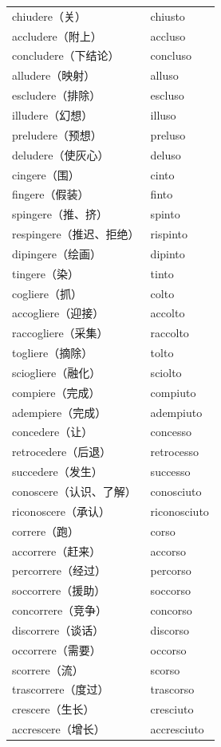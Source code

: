 \documentclass[UTF8,a4paper,titlepage,10pt]{report}
\begin{document}
\begin{enumerate}
\begin{itemize}
\begin{center}
\begin{tabular}{ll}
chiudere（关） & chiusto\\
accludere（附上） & accluso\\
concludere（下结论） & concluso\\
alludere（映射） & alluso\\
escludere（排除） & escluso\\
illudere（幻想） & illuso\\
preludere（预想） & preluso\\
deludere（使灰心） & deluso\\
cingere（围） & cinto\\
fingere（假装） & finto\\
spingere（推、挤） & spinto\\
respingere（推迟、拒绝） & rispinto\\
dipingere（绘画） & dipinto\\
tingere（染） & tinto\\
cogliere（抓） & colto\\
accogliere（迎接） & accolto\\
raccogliere（采集） & raccolto\\
togliere（摘除） & tolto\\
sciogliere（融化） & sciolto\\
compiere（完成） & compiuto\\
adempiere（完成） & adempiuto\\
concedere（让） & concesso\\
retrocedere（后退） & retrocesso\\
succedere（发生） & successo\\
conoscere（认识、了解） & conosciuto\\
riconoscere（承认） & riconosciuto\\
correre（跑） & corso\\
accorrere（赶来） & accorso\\
percorrere（经过） & percorso\\
soccorrere（援助） & soccorso\\
concorrere（竞争） & concorso\\
discorrere（谈话） & discorso\\
occorrere（需要） & occorso\\
scorrere（流） & scorso\\
trascorrere（度过） & trascorso\\
crescere（生长） & cresciuto\\
accrescere（增长） & accresciuto\\

\end{tabular}
\end{center}
\end{itemize}
\end{enumerate}
\end{document}
